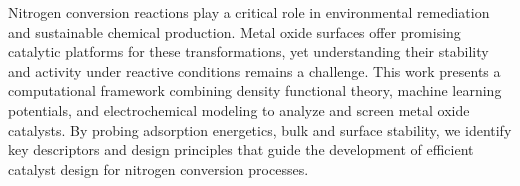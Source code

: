 
\begin{summary}
Nitrogen conversion reactions play a critical role in environmental remediation and sustainable chemical production. Metal oxide surfaces offer promising catalytic platforms for these transformations, yet understanding their stability and activity under reactive conditions remains a challenge. This work presents a computational framework combining density functional theory, machine learning potentials, and electrochemical modeling to analyze and screen metal oxide catalysts. By probing adsorption energetics, bulk and surface stability, we identify key descriptors and design principles that guide the development of efficient catalyst design for nitrogen conversion processes.
\end{summary}